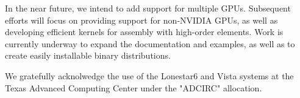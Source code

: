 In the near future, we intend to add support for multiple GPUs. Subsequent efforts will focus on providing support for non-NVIDIA GPUs, as well as developing efficient kernels for assembly with high-order elements. Work is currently underway to expand the documentation and examples, as well as to create easily installable binary distributions.



\begin{acknowledgement}
  We gratefully acknolwedge the use of the Lonestar6 and Vista systems at the Texas Advanced Computing Center under the "ADCIRC" allocation.
\end{acknowledgement}



